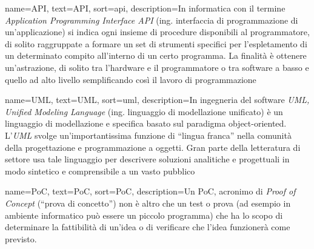 
%






{
    name={API},
    text=API,
    sort=api,
    description={In informatica con il termine \emph{Application Programming Interface API} (ing. interfaccia di programmazione di un'applicazione) si indica ogni insieme di procedure disponibili al programmatore, di solito raggruppate a formare un set di strumenti specifici per l'espletamento di un determinato compito all'interno di un certo programma. La finalità è ottenere un'astrazione, di solito tra l'hardware e il programmatore o tra software a basso e quello ad alto livello semplificando così il lavoro di programmazione}
}

{
    name={UML},
    text=UML,
    sort=uml,
    description={In ingegneria del software \emph{UML, Unified Modeling Language} (ing. linguaggio di modellazione unificato) è un linguaggio di modellazione e specifica basato sul paradigma object-oriented. L'\emph{UML} svolge un'importantissima funzione di ``lingua franca'' nella comunità della progettazione e programmazione a oggetti. Gran parte della letteratura di settore usa tale linguaggio per descrivere soluzioni analitiche e progettuali in modo sintetico e comprensibile a un vasto pubblico}
}

{
    name={PoC},
    text=PoC,
    sort=PoC,
    description={Un PoC, acronimo di \emph{Proof of Concept} (“prova di concetto”) non è altro che un test o prova (ad esempio in ambiente informatico può essere un piccolo programma) che ha lo scopo di determinare la fattibilità di un'idea o di verificare che l'idea funzionerà come previsto.}
}

